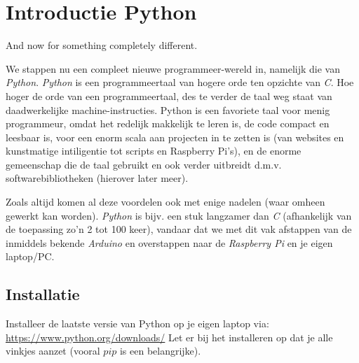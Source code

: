 \chapter{Introductie Python}
\begin{fquote}
	And now for something completely different.
\end{fquote}

We stappen nu een compleet nieuwe programmeer-wereld in, namelijk die van \textit{Python}. \textit{Python} is een programmeertaal van hogere orde ten opzichte van \textit{C}. Hoe hoger de orde van een programmeertaal, des te verder de taal weg staat van daadwerkelijke machine-instructies. \newline
Python is een favoriete taal voor menig programmeur, omdat het redelijk makkelijk te leren is, de code compact en leesbaar is, voor een enorm scala aan projecten in te zetten is (van websites en kunstmatige intiligentie tot scripts en Raspberry Pi's), en de enorme gemeenschap die de taal gebruikt en ook verder uitbreidt d.m.v. softwarebibliotheken (hierover later meer). \newline

Zoals altijd komen al deze voordelen ook met enige nadelen (waar omheen gewerkt kan worden). \textit{Python} is bijv. een stuk langzamer dan \textit{C} (afhankelijk van de toepassing zo'n 2 tot 100 keer), vandaar dat we met dit vak afstappen van de inmiddels bekende \textit{Arduino} en overstappen naar de \textit{Raspberry Pi} en je eigen laptop/PC.

\section{Installatie}
\begin{exercise}
Installeer de laatste versie van Python op je eigen laptop via: \newline
\url{https://www.python.org/downloads/} \newline
Let er bij het installeren op dat je alle vinkjes aanzet (vooral $pip$ is een belangrijke).
\end{exercise}

